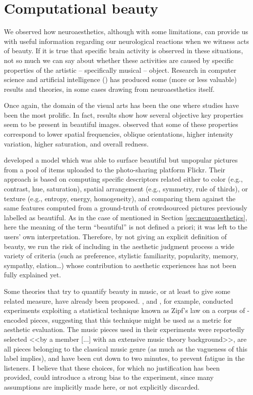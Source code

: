 \section{Computational beauty}\label{sec:comp-beauty}
We observed how neuroaesthetics, although with some limitations, can provide us with useful information regarding our neurological reactions when we witness acts of beauty. If it is true that specific brain activity is observed in these situations, not so much we can say about whether these activities are caused by specific properties of the artistic -- specifically musical -- object. Research in computer science and artificial intelligence () has produced some (more or less valuable) results and theories, in some cases drawing from neuroaesthetics itself.

Once again, the domain of the visual arts has been the one where studies have been the most prolific. In fact, results show how several objective key properties seem to be present in beautiful images. \cite{jacobs2016aesthetics} observed that some of these properties correspond to lower spatial frequencies, oblique orientations, higher intensity variation, higher saturation, and overall redness.

\cite{schifanella2015image} developed a model which was able to surface beautiful but unpopular pictures from a pool of items uploaded to the photo-sharing platform Flickr. Their approach is based on computing specific descriptors related either to color (e.g., contrast, hue, saturation), spatial arrangement (e.g., symmetry, rule of thirds), or texture (e.g., entropy, energy, homogeneity), and comparing them against the same features computed from a ground-truth of crowdsourced pictures previously labelled as beautiful. As in the case of \cite{kawabata2004neural} mentioned in Section \ref{sec:neuroaesthetics}, here the meaning of the term ``beautiful'' is not defined a priori; it was left to the users' own interpretation. Therefore, by not giving an explicit definition of beauty, we run the risk of including in the aesthetic judgment process a wide variety of criteria (such as preference, stylistic familiarity, popularity, memory, sympathy, elation\ldots) whose contribution to aesthetic experiences has not been fully explained yet.

Some theories that try to quantify beauty in music, or at least to give some related measure, have already been proposed. \cite{manaris2002progress}, and \cite{manaris2005zipf}, for example, conducted experiments exploiting a statistical technique known as Zipf’s law on a corpus of -encoded pieces, suggesting that this technique might be used as a metric for aesthetic evaluation. The music pieces used in their experiments were reportedly selected <<by a member [...] with an extensive music theory background>>, are all pieces belonging to the classical music genre (as much as the vagueness of this label implies), and have been cut down to two minutes, to prevent fatigue in the listeners. I believe that these choices, for which no justification has been provided, could introduce a strong bias to the experiment, since many assumptions are implicitly made here, or not explicitly discarded.

